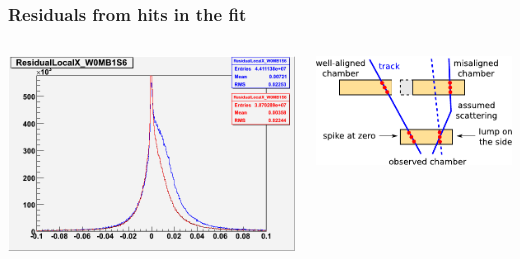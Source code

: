 \documentclass[compress]{beamer}
\begin{document}
\begin{frame}
\frametitle{Residuals from hits in the fit}
\begin{columns}
\includegraphics[width=\linewidth]{ResidualLocalX_W0MB1S6.png}

\vspace{0.75 cm}
\includegraphics[width=\linewidth]{biased_residuals.pdf}


\end{columns}
\end{frame}
\end{document}
